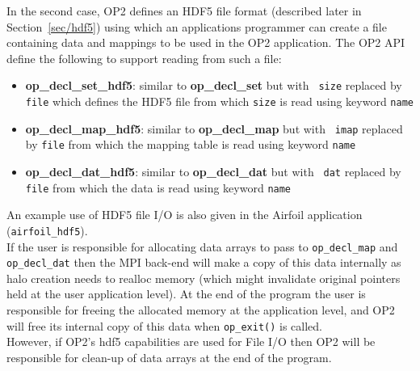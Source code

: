 \documentclass[11pt]{article}
\begin{document}
\noindent In the second case, OP2 defines an HDF5 file format (described
later in Section~\ref{sec/hdf5}) using which an applications programmer can
create a file containing data and mappings to be used in the OP2 application.
The OP2 API define the following to support reading from such a file:
\begin{itemize}
\item {\bf op\_decl\_set\_hdf5}: similar to {\bf op\_decl\_set} but with {\tt
size} replaced by {\tt file} which defines the HDF5 file from which {\tt size}
is read using keyword {\tt name}

\item {\bf op\_decl\_map\_hdf5}: similar to {\bf op\_decl\_map} but with {\tt
imap} replaced by {\tt file} from which the mapping table is read using keyword
{\tt name}

\item {\bf op\_decl\_dat\_hdf5}: similar to {\bf op\_decl\_dat} but with {\tt
dat} replaced by {\tt file} from which the data is read using keyword {\tt name}
\end{itemize}

\noindent An example use of HDF5 file I/O is also given in the Airfoil application (\texttt{airfoil\_hdf5}).\\

\noindent If the user is responsible for allocating data arrays to pass to \texttt{op\_decl\_map} and
\texttt{op\_decl\_dat} then the MPI back-end will make a copy of this data internally as halo creation needs to realloc
memory (which might invalidate original pointers held at the user application level). At the end of the program the user
is responsible for freeing the allocated memory at the application level, and OP2 will free its internal copy of this
data when \texttt{op\_exit()} is called.\\

\noindent However, if OP2's hdf5 capabilities are used for File I/O then OP2 will be responsible for clean-up of data
arrays at the end of the program.

\newpage


\end{document}
